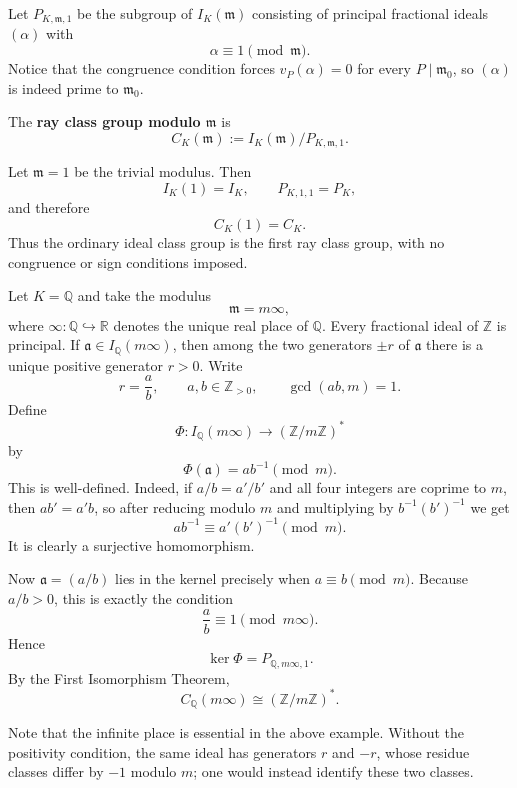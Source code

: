 Let $P_{K,\mathfrak m,1}$ be the subgroup of $I_K(\mathfrak m)$ consisting of principal
fractional ideals $(\alpha)$ with
\[
\alpha\equiv1\pmod{\mathfrak m}.
\]
Notice that the congruence condition forces $v_P(\alpha)=0$ for every
$P\mid\mathfrak m_0$, so $(\alpha)$ is indeed prime to $\mathfrak m_0$.

\begin{definition}
The {\bf ray class group modulo $\mathfrak m$} is
\[
\boxed{C_K(\mathfrak m):=I_K(\mathfrak m)/P_{K,\mathfrak m,1}.}
\]
\end{definition}

\begin{example}
Let $\mathfrak m=1$ be the trivial modulus. Then
\[
I_K(1)=I_K,
\qquad
P_{K,1,1}=P_K,
\]
and therefore
\[
\boxed{C_K(1)=C_K.}
\]
Thus the ordinary ideal class group is the first ray class group, with no congruence or sign
conditions imposed.
\end{example}

\begin{example}\label{eg-rayQ}
Let $K=\mathbb Q$ and take the modulus
\[
\mathfrak m=m\infty,
\]
where $\infty : \mathbb{Q} \hookrightarrow \mathbb{R}$ denotes the unique real place of $\mathbb Q$. Every fractional ideal of
$\mathbb Z$ is principal. If $\mathfrak a\in I_{\mathbb Q}(m\infty)$, then among the two
generators $\pm r$ of $\mathfrak a$ there is a unique positive generator $r>0$. Write
\[
r=\frac ab,
\qquad a,b\in\mathbb Z_{>0},
\qquad \gcd(ab,m)=1.
\]
Define
\[
\Phi:I_{\mathbb Q}(m\infty)\longrightarrow(\mathbb Z/m\mathbb Z)^*
\]
by
\[
\Phi(\mathfrak a)=ab^{-1}\pmod m.
\]
This is well-defined. Indeed, if $a/b=a'/b'$ and all four integers are coprime to $m$,
then $ab'=a'b$, so after reducing modulo $m$ and multiplying by $b^{-1}(b')^{-1}$ we get
\[
ab^{-1}\equiv a'(b')^{-1}\pmod m.
\]
It is clearly a surjective homomorphism.

Now $\mathfrak a=(a/b)$ lies in the kernel precisely when
\(a\equiv b\pmod m.
\)
Because $a/b>0$, this is exactly the condition
\[
\frac ab\equiv1\pmod{m\infty}.
\]
Hence
\[
\ker\Phi=P_{\mathbb Q,m\infty,1}.
\]
By the First Isomorphism Theorem,
\[
\boxed{C_{\mathbb Q}(m\infty)\cong(\mathbb Z/m\mathbb Z)^*.}
\]
\end{example}
Note that the infinite place is essential in the above example. Without the positivity condition, the same ideal has generators $r$ and $-r$, whose residue classes differ by $-1$ modulo $m$; one would instead
identify these two classes.

